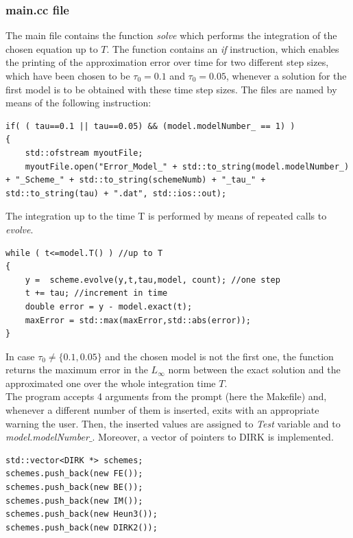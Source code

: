 \documentclass[11pt]{article}
\theoremstyle{theorem}
\theoremstyle{definition}
\begin{document}
\subsubsection{main.cc file}
The main file contains the function \emph{solve} which performs the integration of the chosen equation up to $T$. The function contains an \emph{if} instruction, which enables the printing of the approximation error over time for two different step sizes, which have been chosen to be $\tau_0=0.1$ and $\tau_0=0.05$, whenever a solution for the first model is to be obtained with these time step sizes. The files are named by means of the following instruction:

\begin{lstlisting}
if( ( tau==0.1 || tau==0.05) && (model.modelNumber_ == 1) )
{
	std::ofstream myoutFile;
	myoutFile.open("Error_Model_" + std::to_string(model.modelNumber_) + "_Scheme_" + std::to_string(schemeNumb) + "_tau_" + std::to_string(tau) + ".dat", std::ios::out);
\end{lstlisting}

The integration up to the time T is performed by means of repeated calls to \emph{evolve}.

\begin{lstlisting}
while ( t<=model.T() ) //up to T
{
	y =  scheme.evolve(y,t,tau,model, count); //one step
	t += tau; //increment in time
	double error = y - model.exact(t); 
	maxError = std::max(maxError,std::abs(error));
}
\end{lstlisting}

In case $\tau_0\neq\lbrace 0.1, 0.05\rbrace$ and the chosen model is not the first one,  the function returns the maximum error in the $L_\infty$ norm between the exact solution and the approximated one over the whole integration time $T$.\\

The program accepts 4 arguments from the prompt (here the Makefile) and, whenever a different number of them is inserted, exits with an appropriate warning the user. Then, the inserted values are assigned to \emph{Test} variable and to \emph{model.modelNumber$\_$}. Moreover, a vector of pointers to DIRK is implemented.

\begin{lstlisting}
std::vector<DIRK *> schemes;
schemes.push_back(new FE());
schemes.push_back(new BE());
schemes.push_back(new IM());
schemes.push_back(new Heun3());
schemes.push_back(new DIRK2());
\end{lstlisting}
\end{document}
